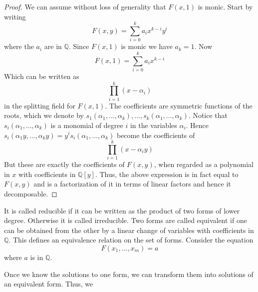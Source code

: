 \documentclass{article}
\newcommand{\mbb}[1]{\mathbb{#1}}
\begin{document}
\begin{proof}
    We can assume without loss of generality that $F(x, 1)$ is monic. Start by writing
    $$F(x, y) = \sum_{i=0}^k a_i x^{k-i} y^i$$
    where the $a_i$ are in $\mbb{Q}$. Since $F(x, 1)$ is monic we have $a_k = 1$. Now 
    $$F(x, 1) = \sum_{i=0}^k a_i x^{k-i}$$
    Which can be written as
    $$\prod_{i=1}^k (x - \alpha_i)$$
    in the splitting field for $F(x,1)$. The coefficients are symmetric functions of the roots, which we denote by $s_1(\alpha_1, ..., \alpha_k), ..., s_k(\alpha_1, ..., \alpha_k)$. Notice that $s_i(\alpha_1, ..., \alpha_k)$ is a monomial of degree $i$ in the variables $\alpha_i$. Hence $s_i(\alpha_1y, ..., \alpha_k y) = y^i s_i(\alpha_1, ..., \alpha_k)$ become the coefficients of 
    $$\prod_{i=1}^k (x - \alpha_iy)$$
    But these are exactly the coefficients of $F(x,y)$, when regarded as a polynomial in $x$ with coefficients in $\mbb{Q}[y]$. Thus, the above expression is in fact equal to $F(x,y)$ and is a factorization of it in terms of linear factors and hence it decomposable.
\end{proof}




It is called reducible if it can be written as the product of two forms of lower degree. Otherwise it is called irreducible. Two forms are called equivalent if one can be obtained from the other by a linear change of variables with coefficients in $\mbb{Q}$. This defines an equivalence relation on the set of forms. Consider the equation 
$$F(x_1, ..., x_m) = a$$
where $a$ is in $\mbb{Q}$. 

Once we know the solutions to one form, we can transform them into solutions of an equivalent form. Thus, we \
\end{document}
